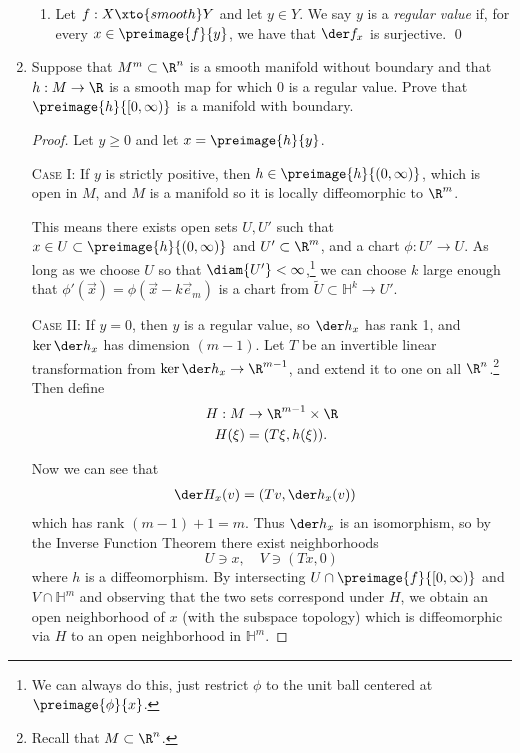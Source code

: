 \documentclass[12pt,letterpaper]{article}
\let\oldphi\phi
\renewcommand{\phi}{\oldphi}
\renewcommand{\H}{\mathbb{H}}
\begin{document}
\begin{enumerate}
\begin{enumerate}[label=(\alph*)]
	\item \mbox{}	\vspace*{-1.5\baselineskip}
	\begin{definition*}
	Let $f:X\xto{smooth}Y$ and let $y\in Y$. We say $y$ is a \emph{regular value} if, for every $x\in \preimage{f}{y}$, we have that $\der f_x$ is surjective. \qed
	\end{definition*}
	
	\end{enumerate}

\pagebreak
\item Suppose that $M^m\subset\R^n$ is a smooth manifold without boundary and that $h :
M \to \R$ is a smooth map for which $0$ is a regular value. Prove that
$\preimage{h}{[0,\infty)}$ is a manifold with boundary.
\begin{proof}
Let $y\geq 0$ and let $x=\preimage{h}{y}$. 


\textsc{Case I:} If $y$ is strictly positive, then $h\in \preimage{h}{(0,\infty)}$, which is open in $M$, and $M$ is a manifold so it is locally diffeomorphic to $\R^m$.

This means there exists open sets $U,U'$ such that $x\in U\subset \preimage{h}{(0,\infty)}$ and $U'\subset \R^m$, and a chart $\phi:U'\to U$. As long as we choose $U$ so that $\diam{U'}<\infty$,\footnote{We can always do this, just restrict $\phi$ to the unit ball centered at $\preimage{\phi}{x}$.} we can choose $k$ large enough that $\phi'(\vec x)=\phi(\vec x-k \vec{e}_m)$ is a chart from $\tilde U\subset \H^k\to U'$. \qedwhite

\textsc{Case II:} If $y=0$, then $y$ is a regular value, so $\der h_x$ has rank 1, and $\ker \der h_x$ has dimension $(m-1)$. Let $T$ be an invertible linear transformation from $\ker \der h_x\to \R^{m-1}$, and extend it to one on all $\R^n$.\footnote{Recall that $M\subset \R^n$.} Then define 
\begin{align*}
H:M&\to \R^{m-1}\times \R \\
H(\xi) &= (T\xi, h(\xi)). 
\end{align*}

Now we can see that 
\begin{align*}
\der H_x(v) &= (Tv, \der h_x(v))
\end{align*}
which has rank $(m-1)+1=m$. Thus $\der h_x$ is an isomorphism, so by the Inverse Function Theorem there exist neighborhoods 
$$U\ni x, \quad V\ni (Tx, 0)$$
where $h$ is a diffeomorphism. 
By intersecting $U\cap \preimage{f}{[0,\infty)}$ and $V\cap \H^m$ and observing that the two sets correspond under $H$, we obtain an open neighborhood of $x$ (with the subspace topology) which is diffeomorphic via $H$ to an open neighborhood in $\H^m$. \qedwhite


\end{proof}
\end{enumerate}
\end{document}
